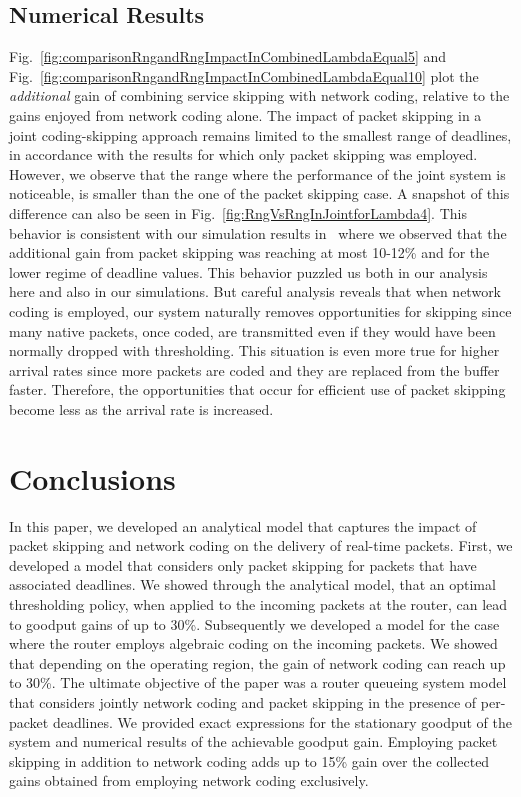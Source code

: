 \documentclass[preprint,12pt]{elsarticle}
\theoremstyle{definition}
\theoremstyle{plain}
\theoremstyle{remark}
\begin{document}
\subsection{Numerical Results} \label{section:numerical-results-joint}
Fig.~\ref{fig:comparisonRngandRngImpactInCombinedLambdaEqual5} and Fig.~\ref{fig:comparisonRngandRngImpactInCombinedLambdaEqual10} plot the \textit{additional} gain of combining service skipping with network coding, relative to the gains enjoyed from network coding alone. The impact of packet skipping in a joint coding-skipping approach remains limited to the smallest range of deadlines, in accordance with the results for which only packet skipping was employed. However, we observe that the range where the performance of the joint system is noticeable, is smaller than the one of the packet skipping case. A snapshot of this difference can also be seen in Fig.~\ref{fig:RngVsRngInJointforLambda4}. This behavior is consistent with our simulation results in~\cite{aoun-ewsn2011} where we observed that the additional gain from packet skipping was reaching at most 10-12\% and for the lower regime of deadline values. This behavior puzzled us both in our analysis here and also in our simulations. But careful analysis reveals that when network coding is employed, our system naturally removes opportunities for skipping since many native packets, once coded, are transmitted even if they would have been normally dropped with thresholding. This situation is even more true for higher arrival rates since more packets are coded and they are replaced from the buffer faster. Therefore, the opportunities that occur for efficient use of packet skipping become less as the arrival rate is increased.





\section{Conclusions}
\label{section:conclusions}
In this paper, we developed an analytical model that captures the impact of packet skipping and network coding on the delivery of real-time packets. First, we developed a model that considers only packet skipping for packets that have associated deadlines. We showed through the analytical model, that an optimal thresholding policy, when applied to the incoming packets at the router, can lead to goodput gains of up to 30\%.
Subsequently we developed a model for the case where the router employs algebraic coding on the incoming packets. We showed that depending on the operating region, the gain of network coding can reach up to 30\%. The ultimate objective of the paper was a router queueing system model that considers jointly network coding and packet skipping in the presence of per-packet deadlines. We provided exact expressions for the stationary goodput of the system and numerical results of the achievable goodput gain. Employing packet skipping in addition to network coding adds up to 15\% gain over the collected gains obtained from employing network coding exclusively.
\end{document}
